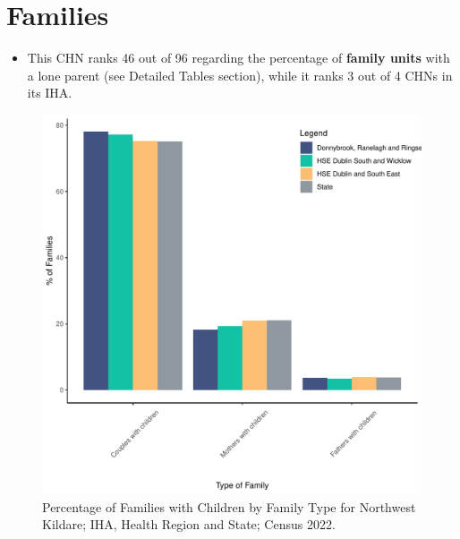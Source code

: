 \documentclass{article}
\begin{document}
\section{Families}\label{sect:Fam}
\begin{itemize}
\item This CHN ranks  46 out of 96 regarding the percentage of \textbf{family units} with a lone parent (see Detailed Tables section), while it ranks   3 out of 4 CHNs in its IHA.
\end{itemize}
\begin{figure}[H]
	\centering
	\includegraphics[width = 150mm]{../figures/FamED.pdf}
	\caption{Percentage of Families with Children by Family Type for Northwest Kildare; IHA, Health Region and State; Census 2022.}
	\label{fig:vbnv}
	\end{figure}
	
\end{document}
